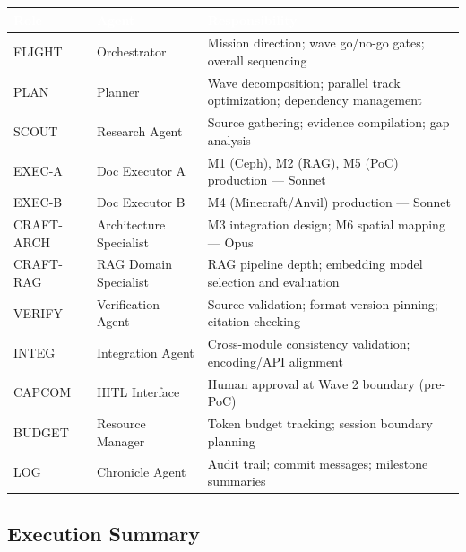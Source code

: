 \documentclass[11pt,letterpaper]{article}
\newcommand{\tableheader}[1]{\textbf{\sffamily\textcolor{white}{#1}}}
\begin{document}
\begin{center}
\begin{tabularx}{\textwidth}{L{2cm}L{3.5cm}X}
\toprule
{}
\tableheader{Role} & \tableheader{Agent} & \tableheader{Responsibility} \\
\midrule
FLIGHT & Orchestrator & Mission direction; wave go/no-go gates; overall sequencing \\
PLAN & Planner & Wave decomposition; parallel track optimization; dependency management \\
SCOUT & Research Agent & Source gathering; evidence compilation; gap analysis \\
EXEC-A & Doc Executor A & M1 (Ceph), M2 (RAG), M5 (PoC) production --- Sonnet \\
EXEC-B & Doc Executor B & M4 (Minecraft/Anvil) production --- Sonnet \\
CRAFT-ARCH & Architecture Specialist & M3 integration design; M6 spatial mapping --- Opus \\
CRAFT-RAG & RAG Domain Specialist & RAG pipeline depth; embedding model selection and evaluation \\
VERIFY & Verification Agent & Source validation; format version pinning; citation checking \\
INTEG & Integration Agent & Cross-module consistency validation; encoding/API alignment \\
CAPCOM & HITL Interface & Human approval at Wave 2 boundary (pre-PoC) \\
BUDGET & Resource Manager & Token budget tracking; session boundary planning \\
LOG & Chronicle Agent & Audit trail; commit messages; milestone summaries \\
\bottomrule
\end{tabularx}
\end{center}

\subsection{Execution Summary}
\end{document}
